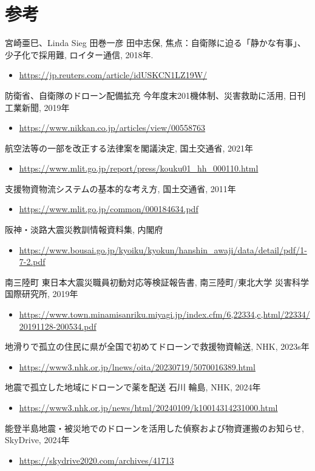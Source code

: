 \documentclass{article}[jsarticle]
\begin{document}
\section{参考}
\begin{thebibliography}{99}
     宮崎亜巳、Linda Sieg 田巻一彦 田中志保, 焦点：自衛隊に迫る「静かな有事」、少子化で採用難, ロイター通信, 2018年.
    \begin{itemize}
        \item \url{https://jp.reuters.com/article/idUSKCN1LZ19W/}
    \end{itemize}
     防衛省、自衛隊のドローン配備拡充 今年度末201機体制、災害救助に活用, 日刊工業新聞, 2019年
    \begin{itemize}
        \item \url{https://www.nikkan.co.jp/articles/view/00558763}
    \end{itemize}
     航空法等の一部を改正する法律案を閣議決定, 国土交通省, 2021年
    \begin{itemize}
        \item \url{https://www.mlit.go.jp/report/press/kouku01_hh_000110.html}
    \end{itemize}
     支援物資物流システムの基本的な考え方, 国土交通省, 2011年
    \begin{itemize}
        \item \url{https://www.mlit.go.jp/common/000184634.pdf}
    \end{itemize}
     阪神・淡路大震災教訓情報資料集, 内閣府
    \begin{itemize}
        \item \url{https://www.bousai.go.jp/kyoiku/kyokun/hanshin_awaji/data/detail/pdf/1-7-2.pdf}
    \end{itemize}
     南三陸町 東日本大震災職員初動対応等検証報告書, 南三陸町/東北大学 災害科学国際研究所, 2019年
    \begin{itemize}
        \item \url{https://www.town.minamisanriku.miyagi.jp/index.cfm/6,22334,c,html/22334/20191128-200534.pdf}
    \end{itemize}
     地滑りで孤立の住民に県が全国で初めてドローンで救援物資輸送, NHK, 2023s年
    \begin{itemize}
        \item \url{https://www3.nhk.or.jp/lnews/oita/20230719/5070016389.html}
    \end{itemize}
     地震で孤立した地域にドローンで薬を配送 石川 輪島, NHK, 2024年
    \begin{itemize}
        \item \url{https://www3.nhk.or.jp/news/html/20240109/k10014314231000.html}
    \end{itemize}
     能登半島地震・被災地でのドローンを活用した偵察および物資運搬のお知らせ, SkyDrive, 2024年
    \begin{itemize}
        \item \url{https://skydrive2020.com/archives/41713}
    \end{itemize}
\end{thebibliography}
\end{document}
